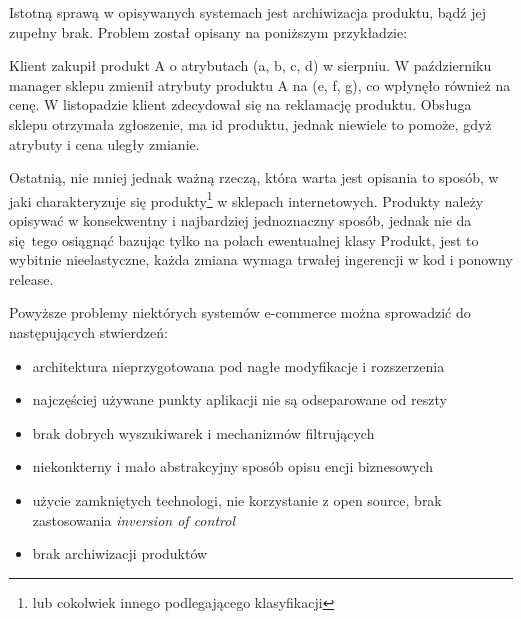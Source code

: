 Istotną sprawą w opisywanych systemach jest archiwizacja produktu, bądź jej zupełny brak. Problem został opisany na poniższym przykładzie:
\begin{example}
	Klient zakupił produkt A o atrybutach (a, b, c, d) w sierpniu. W październiku manager sklepu zmienił atrybuty produktu A na (e, f, g), co wpłynęło również na cenę. W listopadzie klient zdecydował się na reklamację produktu. Obsługa sklepu otrzymała zgłoszenie, ma id produktu, jednak niewiele to pomoże, gdyż atrybuty i cena uległy zmianie. 
\end{example}

Ostatnią, nie mniej jednak ważną rzeczą, która warta jest opisania to sposób, w jaki charakteryzuje się produkty\footnote{ lub cokolwiek innego podlegającego klasyfikacji} w sklepach internetowych. Produkty należy opisywać w konsekwentny i najbardziej jednoznaczny sposób, jednak nie da się tego osiągnąć bazując tylko na polach ewentualnej klasy Produkt, jest to wybitnie nieelastyczne, każda zmiana wymaga trwałej ingerencji w kod i ponowny release.

Powyższe problemy niektórych systemów e-commerce można sprowadzić do następujących stwierdzeń:
\begin{itemize}
	\item architektura nieprzygotowana pod nagłe modyfikacje i rozszerzenia
	\item najczęściej używane punkty aplikacji nie są odseparowane od reszty
	\item brak dobrych wyszukiwarek i mechanizmów filtrujących
	\item niekonkterny i mało abstrakcyjny sposób opisu encji biznesowych
	\item użycie zamkniętych technologi, nie korzystanie z open source, brak zastosowania \textit{inversion of control}
	\item brak archiwizacji produktów
\end{itemize}

